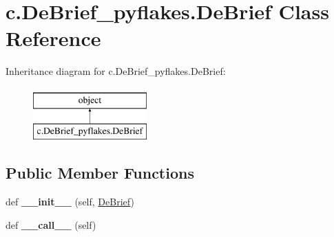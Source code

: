 \hypertarget{classc_1_1_de_brief__pyflakes_1_1_de_brief}{}\section{c.\+De\+Brief\+\_\+pyflakes.\+De\+Brief Class Reference}
\label{classc_1_1_de_brief__pyflakes_1_1_de_brief}
Inheritance diagram for c.\+De\+Brief\+\_\+pyflakes.\+De\+Brief\+:\begin{figure}[H]
\begin{center}
\leavevmode
\includegraphics[height=2.000000cm]{classc_1_1_de_brief__pyflakes_1_1_de_brief}
\end{center}
\end{figure}
\subsection*{Public Member Functions}
\begin{DoxyCompactItemize}
\item 
\hypertarget{classc_1_1_de_brief__pyflakes_1_1_de_brief_a07733068c98589442e806efce20dbd6e}{}def {\bfseries \+\_\+\+\_\+init\+\_\+\+\_\+} (self, \hyperlink{classc_1_1_de_brief__pyflakes_1_1_de_brief}{De\+Brief})\label{classc_1_1_de_brief__pyflakes_1_1_de_brief_a07733068c98589442e806efce20dbd6e}

\item 
\hypertarget{classc_1_1_de_brief__pyflakes_1_1_de_brief_ae613c7812f5e031cbfe4c5489a515780}{}def {\bfseries \+\_\+\+\_\+call\+\_\+\+\_\+} (self)\label{classc_1_1_de_brief__pyflakes_1_1_de_brief_ae613c7812f5e031cbfe4c5489a515780}

\end{DoxyCompactItemize}
